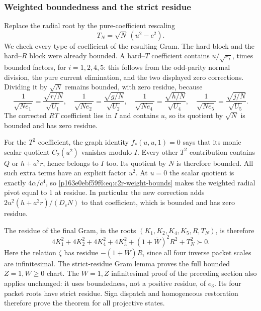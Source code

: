 \subsubsection*{Weighted boundedness and the strict residue}
Replace the radial root by the pure-coefficient rescaling
\[
T_N=\sqrt N\,(u^2-c^2).
\]
We check every type of coefficient of the resulting Gram.  The hard
block and the hard--$R$ block were already bounded.  A hard--$T$
coefficient contains $u/\sqrt{e_i}$, times bounded factors, for
$i=1,2,4,5$: this follows from the odd-parity normal division, the pure
current elimination, and the two displayed zero corrections.  Dividing
it by $\sqrt N$ remains bounded, with zero residue, because
\[
\frac1{\sqrt{Ne_1}}=\frac{\sqrt{r/N}}{\sqrt{U_1}},\quad
\frac1{\sqrt{Ne_2}}=\frac{\sqrt{g/N}}{\sqrt{U_2}},\quad
\frac1{\sqrt{Ne_4}}=\frac{\sqrt{h/N}}{\sqrt{U_4}},\quad
\frac1{\sqrt{Ne_5}}=\frac{\sqrt{j/N}}{\sqrt{U_5}}.
\]
The corrected $RT$ coefficient lies in $I$ and contains $u$, so its
quotient by $\sqrt N$ is bounded and has zero residue.

For the $T^2$ coefficient, the graph identity $f_*(u,u,1)=0$ says that
its monic scalar quotient $C_2(u^2)$ vanishes modulo $I$.  Every other
$T^2$ contribution contains $Q$ or $h+a^2r$, hence belongs to $I$ too.
Its quotient by $N$ is therefore bounded.  All such extra terms have
an explicit factor $u^2$.  At $u=0$ the scalar quotient is exactly
$4\alpha/c^4$, so \eqref{p163e0ebf59f6:eq:c2r-weight-bounds} makes the weighted radial
pivot equal to $1$ at residue.  In particular the new correction adds
$2u^2(h+a^2r)/(D_cN)$ to that coefficient, which is bounded and has
zero residue.

The residue of the final Gram, in the roots
$(K_1,K_2,K_4,K_5,R,T_N)$, is therefore
\begin{equation}
4K_1^2+4K_2^2+4K_4^2+4K_5^2
 +(1+\overline W)^2R^2+T_N^2\succ0.
\label{p163e0ebf59f6:eq:c2r-strict-residue}
\end{equation}
Here the relation $\zeta$ has residue $-(1+\overline W)R$, since all
four inverse packet scales are infinitesimal.  The strict-residue Gram
lemma proves the full bounded $Z=1,W\geq0$ chart.  The $W=1,Z$
infinitesimal proof of the preceding section also applies unchanged:
it uses boundedness, not a positive residue, of $e_3$.  Its four packet
roots have strict residue.  Sign dispatch and homogeneous restoration
therefore prove the theorem for all projective states.


